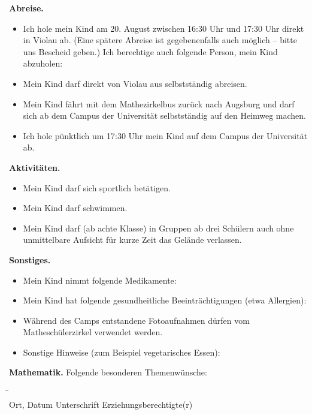 \documentclass{zettel}
\begin{document}
\begin{shaded}
\textbf{Abreise.}
\begin{itemize}
\item[\checkbox] Ich hole mein Kind am 20. August zwischen 16:30 Uhr und 17:30
Uhr direkt in Violau ab. (Eine spätere Abreise ist gegebenenfalls auch möglich
-- bitte uns Bescheid geben.) Ich berechtige auch folgende Person, mein Kind
abzuholen:

\vspace{0.3em}
\freistLang
\item[\checkbox] Mein Kind darf direkt von Violau aus selbstständig abreisen.
\item[\checkbox] Mein Kind fährt mit dem Mathezirkelbus zurück nach Augsburg und darf sich
ab dem Campus der Universität selbstständig auf den Heimweg machen.
\item[\checkbox] Ich hole pünktlich um 17:30 Uhr mein Kind auf dem Campus der
Universität ab.
\end{itemize}
\end{shaded}

\begin{shaded}
\textbf{Aktivitäten.}
\begin{itemize}
  \item[\checkbox] Mein Kind darf sich sportlich betätigen.
  \item[\checkbox] Mein Kind darf schwimmen.
  \item[\checkbox] Mein Kind darf (ab achte Klasse) in Gruppen ab drei Schülern
  auch ohne unmittelbare Aufsicht für kurze Zeit das Gelände verlassen.
\end{itemize}
\end{shaded}

\begin{shaded}
\textbf{Sonstiges.}
\begin{itemize}
  \item[\checkbox] Mein Kind nimmt folgende Medikamente: \\[1em] \freistLang
  \item[\checkbox] Mein Kind hat folgende gesundheitliche Beeinträchtigungen
  (etwa Allergien): \\[1em] \freistLang
  \item[\checkbox] Während des Camps entstandene Fotoaufnahmen dürfen
  vom Matheschülerzirkel verwendet werden.
  \item[\checkbox] Sonstige Hinweise (zum Beispiel vegetarisches Essen): \\[1em]
  \freistLang
\end{itemize}
\end{shaded}

\begin{shaded}
\textbf{Mathematik.} Folgende besonderen Themenwünsche:
\freist{5cm}
\end{shaded}

\enlargethispage{0.5cm}

\begin{tabbing}
  \freistMittel \qquad\qquad \= \kill
  \freistMittel \> \freistLaenger \\
  Ort, Datum \> Unterschrift Erziehungsberechtigte(r)
\end{tabbing}
\end{document}
